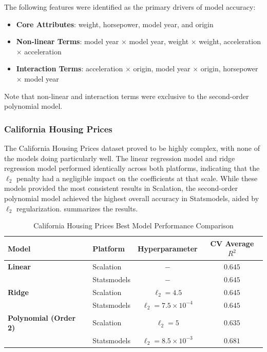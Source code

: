 \documentclass{article}
\begin{document}
The following features were identified as the primary drivers of model accuracy:
\begin{itemize}
	\item \textbf{Core Attributes}: weight, horsepower, model year, and origin
	\item \textbf{Non-linear Terms}: model year $\times$ model year, weight $\times$ weight, acceleration $\times$ acceleration
	\item \textbf{Interaction Terms}: acceleration $\times$ origin, model year $\times$ origin, horsepower $\times$ model year
\end{itemize}
Note that non-linear and interaction terms were exclusive to the second-order polynomial model.

\subsubsection{California Housing Prices}

The California Housing Prices dataset proved to be highly complex, with none of the models doing particularly well. The linear regression model and ridge regression model performed identically across both platforms, indicating that the $\ell_2$ penalty had a negligible impact on the coefficients at that scale. While these models provided the most consistent results in Scalation, the second-order polynomial model achieved the highest overall accuracy in Statsmodels, aided by $\ell_2$ regularization.  summarizes the results.

\begin{table}[H]
\centering
\caption{California Housing Prices Best Model Performance Comparison}
\label{tab:California Housing Prices Best Model Performance Comparison}
\begin{tabular}{@{}llcc@{}}
\toprule
\textbf{Model} & \textbf{Platform} & \textbf{Hyperparameter} & \textbf{CV Average $R^2$} \\ \midrule
\textbf{Linear} & Scalation   & $-$ & $0.645$ \\
                              & Statsmodels & $-$ & $0.645$ \\ \addlinespace
\textbf{Ridge} & Scalation   & $\ell_2 = 4.5$ & $0.645$ \\
                              & Statsmodels & $\ell_2 = 7.5 \times 10^{-4}$ & $0.645$ \\ \addlinespace
\textbf{Polynomial (Order 2)} & Scalation   & $\ell_2 = 5$ & $0.635$ \\
                              & Statsmodels & $\ell_2 = 8.5 \times 10^{-3}$ & $0.681$ \\ \bottomrule
\end{tabular}
\end{table}
\end{document}
